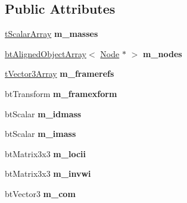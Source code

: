 \subsection*{Public Attributes}
\begin{DoxyCompactItemize}
\item 
\mbox{\label{structbtSoftBody_1_1Cluster_ad06448becadded3ea08cab6e75568df8}} 
\hyperlink{classbtAlignedObjectArray}{t\+Scalar\+Array} {\bfseries m\+\_\+masses}
\item 
\mbox{\label{structbtSoftBody_1_1Cluster_a5d67503d77a08f0bf7b974f08cd01f01}} 
\hyperlink{classbtAlignedObjectArray}{bt\+Aligned\+Object\+Array}$<$ \hyperlink{structbtSoftBody_1_1Node}{Node} $\ast$ $>$ {\bfseries m\+\_\+nodes}
\item 
\mbox{\label{structbtSoftBody_1_1Cluster_a3893f7524acfdea8831df7708ad39611}} 
\hyperlink{classbtAlignedObjectArray}{t\+Vector3\+Array} {\bfseries m\+\_\+framerefs}
\item 
\mbox{\label{structbtSoftBody_1_1Cluster_addf1cd863cb3f8c8df8bf03796dbba61}} 
bt\+Transform {\bfseries m\+\_\+framexform}
\item 
\mbox{\label{structbtSoftBody_1_1Cluster_aee6721b33ced03dce7eb642bbb28f43b}} 
bt\+Scalar {\bfseries m\+\_\+idmass}
\item 
\mbox{\label{structbtSoftBody_1_1Cluster_aa6ae5e2414ffb4f3a60e2d9c62990ebe}} 
bt\+Scalar {\bfseries m\+\_\+imass}
\item 
\mbox{\label{structbtSoftBody_1_1Cluster_a5d0f7ef744ac87b5e6a9d98b2a583aa4}} 
bt\+Matrix3x3 {\bfseries m\+\_\+locii}
\item 
\mbox{\label{structbtSoftBody_1_1Cluster_a45ebe0fba8ad921de4d3f6bff9e42858}} 
bt\+Matrix3x3 {\bfseries m\+\_\+invwi}
\item 
\mbox{\label{structbtSoftBody_1_1Cluster_a605fbcd7af2056321b5be4a3ac04c3e8}} 
bt\+Vector3 {\bfseries m\+\_\+com}

\end{DoxyCompactItemize}
